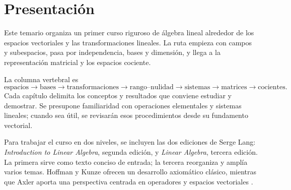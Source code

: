 \chapter*{Presentación}

Este temario organiza un primer curso riguroso de álgebra lineal alrededor de los espacios vectoriales y las transformaciones lineales. La ruta empieza con campos y subespacios, pasa por independencia, bases y dimensión, y llega a la representación matricial y los espacios cociente.

La columna vertebral es
\[
  \text{espacios}\longrightarrow\text{bases}\longrightarrow
  \text{transformaciones}\longrightarrow\text{rango--nulidad}\longrightarrow
  \text{sistemas}\longrightarrow\text{matrices}\longrightarrow\text{cocientes}.
\]
Cada capítulo delimita los conceptos y resultados que conviene estudiar y demostrar. Se presupone familiaridad con operaciones elementales y sistemas lineales; cuando sea útil, se revisarán esos procedimientos desde su fundamento vectorial.

Para trabajar el curso en dos niveles, se incluyen las dos ediciones de Serge Lang: \emph{Introduction to Linear Algebra}, segunda edición, y \emph{Linear Algebra}, tercera edición. La primera sirve como texto conciso de entrada; la tercera reorganiza y amplía varios temas. Hoffman y Kunze ofrecen un desarrollo axiomático clásico, mientras que Axler aporta una perspectiva centrada en operadores y espacios vectoriales \cite{lang1986,lang1987,hoffmankunze1971,axler2024}.
